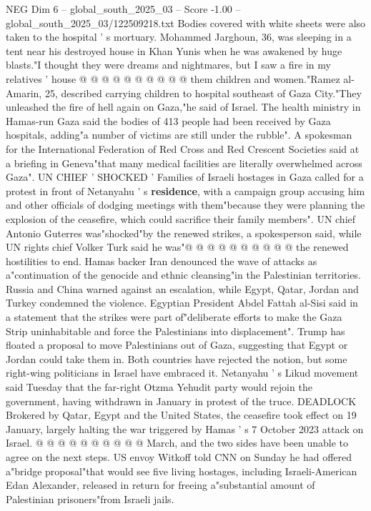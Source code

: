 \begin{textsample}{NEG Dim 6 – global\_south\_2025\_03 – Score -1.00 – global\_south\_2025\_03/122509218.txt}
Bodies covered with white sheets were also taken to the hospital ' s mortuary.
Mohammed Jarghoun, 36, was sleeping in a tent near his destroyed house in Khan Yunis when he was awakened by huge blasts."I thought they were dreams and nightmares, but I saw a fire in my relatives ' house @ @ @ @ @ @ @ @ @ @ them children and women."Ramez al-Amarin, 25, described carrying children to hospital southeast of Gaza City."They unleashed the fire of hell again on Gaza,"he said of Israel.
The health ministry in Hamas-run Gaza said the bodies of 413 people had been received by Gaza hospitals, adding"a number of victims are still under the rubble".
A spokesman for the International Federation of Red Cross and Red Crescent Societies said at a briefing in Geneva"that many medical facilities are literally overwhelmed across Gaza".
UN CHIEF ' SHOCKED ' Families of Israeli hostages in Gaza called for a protest in front of Netanyahu ' s \textbf{residence}, with a campaign group accusing him and other officials of dodging meetings with them"because they were planning the explosion of the ceasefire, which could sacrifice their family members".
UN chief Antonio Guterres was"shocked"by the renewed strikes, a spokesperson said, while UN rights chief Volker Turk said he was"@ @ @ @ @ @ @ @ @ @ the renewed hostilities to end.
Hamas backer Iran denounced the wave of attacks as a"continuation of the genocide and ethnic cleansing"in the Palestinian territories.
Russia and China warned against an escalation, while Egypt, Qatar, Jordan and Turkey condemned the violence.
Egyptian President Abdel Fattah al-Sisi said in a statement that the strikes were part of"deliberate efforts to make the Gaza Strip uninhabitable and force the Palestinians into displacement".
Trump has floated a proposal to move Palestinians out of Gaza, suggesting that Egypt or Jordan could take them in.
Both countries have rejected the notion, but some right-wing politicians in Israel have embraced it.
Netanyahu ' s Likud movement said Tuesday that the far-right Otzma Yehudit party would rejoin the government, having withdrawn in January in protest of the truce.
DEADLOCK Brokered by Qatar, Egypt and the United States, the ceasefire took effect on 19 January, largely halting the war triggered by Hamas ' s 7 October 2023 attack on Israel. @ @ @ @ @ @ @ @ @ @ March, and the two sides have been unable to agree on the next steps.
US envoy Witkoff told CNN on Sunday he had offered a"bridge proposal"that would see five living hostages, including Israeli-American Edan Alexander, released in return for freeing a"substantial amount of Palestinian prisoners"from Israeli jails.

\end{textsample}
